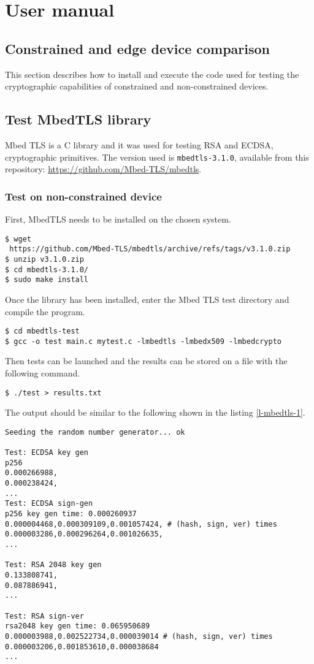 
\section{User manual}
\subsection{Constrained and edge device comparison}
This section describes how to install and execute the code used for testing the cryptographic capabilities of constrained and non-constrained devices.
\subsection*{Test MbedTLS library}
Mbed TLS \cite{mbed-tls} is a C library and it was used for testing RSA and ECDSA, cryptographic primitives. The version used is \texttt{mbedtls-3.1.0}, available from this repository: \url{https://github.com/Mbed-TLS/mbedtls}. 

\subsubsection{Test on non-constrained device}
First, MbedTLS needs to be installed on the chosen system. 
\begin{lstlisting}[frame=single]
$ wget 
 https://github.com/Mbed-TLS/mbedtls/archive/refs/tags/v3.1.0.zip
$ unzip v3.1.0.zip
$ cd mbedtls-3.1.0/
$ sudo make install
\end{lstlisting}

Once the library has been installed, enter the Mbed TLS test directory and compile the program.  
\begin{lstlisting}[frame=single]
$ cd mbedtls-test
$ gcc -o test main.c mytest.c -lmbedtls -lmbedx509 -lmbedcrypto
\end{lstlisting}

Then tests can be launched and the results can be stored on a file with the following command. 
\begin{lstlisting}[frame=single]
$ ./test > results.txt
\end{lstlisting}

The output should be similar to the following shown in the listing \ref{l-mbedtls-1}. 
\begin{lstlisting}[caption={Example of MbedTLS tests output on non-constrained device},captionpos=b,label={l-mbedtls-1},style=DOS,frame=single]
Seeding the random number generator... ok

Test: ECDSA key gen
p256
0.000266988,
0.000238424,
...
Test: ECDSA sign-gen
p256 key gen time: 0.000260937
0.000004468,0.000309109,0.001057424, # (hash, sign, ver) times
0.000003286,0.000296264,0.001026635,
...

Test: RSA 2048 key gen
0.133808741,
0.087886941,
...

Test: RSA sign-ver
rsa2048 key gen time: 0.065950689
0.000003988,0.002522734,0.000039014 # (hash, sign, ver) times
0.000003206,0.001853610,0.000038684
...
\end{lstlisting}

